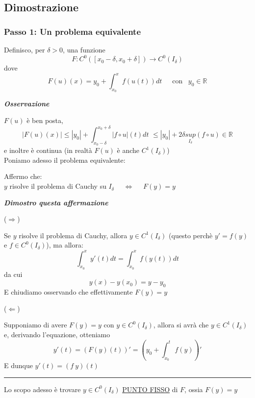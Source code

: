 \documentclass{article}
\theoremstyle{definition}
\newcommand{\linea}{\vspace{15pt}\hrule\vspace{15pt}}
\newcommand{\R}{\mathbb{R}}
\begin{document}
\subsection{Dimostrazione}
\subsubsection{Passo 1: Un problema equivalente}
Definisco, per $\delta > 0$, una funzione
\begin{equation}
    F: C^0([x_0-\delta, x_0+\delta]) \to C^0(I_\delta)
\end{equation}
dove
\begin{equation}
    F(u)(x)=y_0+\int_{x_0}^x f(u(t))dt \,\,\,\,\,\,\,\,\, \mbox{con} \,\,\,\,\, y_0 \in \R
\end{equation}
\begin{center}
    \textbf{\textit{Osservazione}}
\end{center}
$F(u)$ è ben posta,
\begin{equation}
    |F(u)(x)| \leqslant |y_0|+ \int_{x_0-\delta}^{x_0+\delta}|f \circ u|(t) dt \,\, \leqslant |y_0|+ 2\delta \underset{I_\delta}{sup}(f \circ u) \in \R
\end{equation}
e inoltre è continua (in realtà $F(u)$ è anche $C^1(I_\delta)$)
\\
Poniamo adesso il problema equivalente:
\begin{center}
    Affermo che: \\
    $y$ risolve il problema di Cauchy su $I_\delta$ \,\,\,\, $\Longleftrightarrow$ \,\,\,\, $F(y)=y$
\end{center}
\begin{center}
    \textbf{\textit{Dimostro questa affermazione}}
\end{center}
\begin{center}
    ($\Longrightarrow$)
\end{center}
Se $y$ risolve il problema di Cauchy, allora $y \in C^1(I_\delta)$ (questo perchè $y'=f(y)$ e $f \in C^0(I_\delta)$), ma allora:
\begin{equation}
    \int_{x_0}^x y'(t)dt=\int_{x_0}^x f(y(t))dt
\end{equation}
da cui
\begin{equation}
    y(x)-y(x_0)=y-y_0
\end{equation}
E chiudiamo osservando che effettivamente $F(y)=y$
\begin{center}
    ($\Longleftarrow$)
\end{center}
Supponiamo di avere $F(y)=y$ con $y \in C^0(I_\delta)$, allora si avrà che $y \in C^1(I_\delta)$ e, derivando l'equazione, otteniamo
\begin{equation}
    y'(t)=(F(y)(t))'=(y_0+\int_{x_0}^t f(y))'
\end{equation}
E dunque $y'(t)=(f \ y)(t)$
\linea{}
Lo scopo adesso è trovare $y \in C^0(I_\delta)$ \underline{PUNTO FISSO} di $F$, ossia $F(y)=y$
\end{document}
